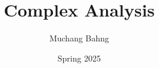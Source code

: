 \documentclass{article}
\begin{document}
\title{Complex Analysis}
\author{Muchang Bahng}
\date{Spring 2025}

\maketitle
\tableofcontents
\pagebreak





\end{document}
